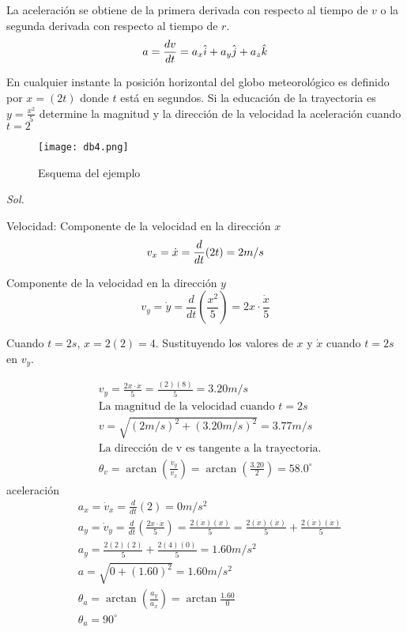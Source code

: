 La aceleración se obtiene de la primera derivada con respecto al tiempo de $v$ o la segunda derivada con respecto al tiempo de $r$. 
\begin{equation}
    a=\frac{dv}{dt}=a_x\hat{i}+a_y\hat{j}+a_z\hat{k}\\
\end{equation}


\begin{example}
    En cualquier instante la posición horizontal del globo meteorológico es definido por $x=(2t)$ donde $t$ está en segundos. Si la educación de la trayectoria es $y=\frac{x^2}{5}$ determine la magnitud y la dirección de la velocidad  la aceleración cuando $t=2$
\end{example}
\begin{figure}[h!]
  \centerline{\texttt{[image: db4.png]}}
  \caption{Esquema del ejemplo}
  \label{db4}
\end{figure}
\textit{ Sol. }

Velocidad: Componente de la velocidad en la dirección $x$
\begin{equation*}
    v_x=\dot{x}=\frac{d}{dt}(2t)=2m/s\\ 
\end{equation*}

Componente de la velocidad en la dirección $y$
\begin{equation*}
    v_y=\dot{y}=\frac{d}{dt}\left(\frac{x^2}{5}\right)=2x\cdot \frac{\dot{x}}{5}
\end{equation*}

Cuando $t=2s$, $x=2(2)=4$. Sustituyendo los valores de $x$ y $\dot{x}$ cuando $t=2s$ en $v_y$.

\begin{align*}
    &v_y=\frac{2x\cdot \dot{x}}{5}=\frac{(2)(8)}{5}=3.20m/s\\
    &\text{La magnitud de la velocidad cuando }t=2s\\
    &v=\sqrt{(2m/s)^2+(3.20m/s)^2}=3.77m/s\\
    &\text{La dirección de v es tangente a la trayectoria}.\\
    &\theta_v=\arctan{\left(\frac{v_y}{v_x}\right)}=\arctan{\left(\frac{3.20}{2}\right)}=58.0^{\circ}
\end{align*}
aceleración
\begin{align*}
    &a_x=\dot{v}_x=\frac{d}{dt}(2)=0m/s^2\\
    &a_y=\dot{v}_y=\frac{d}{dt}\left(\frac{2x\cdot \dot{x}}{5}\right)=\frac{2(\dot{x})(x)}{5}=\frac{2(\dot{x})(\dot{x})}{5}+\frac{2(\dot{x})(\dot{x})}{5}\\
    &a_y=\frac{2(2)(2)}{5}+\frac{2(4)(0)}{5}=1.60m/s^2\\
    &a=\sqrt{0+(1.60)^2}=1.60m/s^2\\
    &\theta_a=\arctan{\left(\frac{a_y}{a_x}\right)}=\arctan{\frac{1.60}{0}}\\
    &\theta_a=90^{\circ}
\end{align*}

